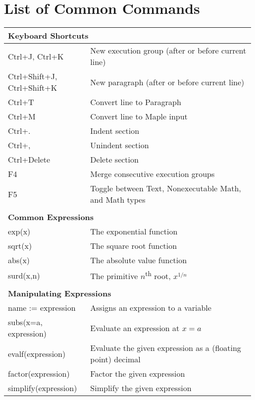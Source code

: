 \chapter{List of Common Commands}
\label{chp:list_of_common_commands}

\begin{fullwidth}
\begin{longtable}{p{0.33\linewidth} p{0.66\linewidth}}
    \multicolumn{2}{l}{\textbf{Keyboard Shortcuts}} \\
    \hline
    Ctrl+J, Ctrl+K & New execution group (after or before current line) \\
    Ctrl+Shift+J, Ctrl+Shift+K & New  paragraph (after or before current line) \\
    Ctrl+T & Convert line to Paragraph \\
    Ctrl+M & Convert line to Maple input \\
    Ctrl+. & Indent section \\
    Ctrl+, & Unindent section \\
    Ctrl+Delete & Delete section \\
    F4 & Merge consecutive execution groups \\
    F5 & Toggle between Text, Nonexecutable Math, and Math types \\
          &  \\
    \multicolumn{2}{l}{\textbf{Common Expressions}} \\
    \hline
    exp(x) & The exponential function \\
    sqrt(x) & The square root function \\
    abs(x) & The absolute value function \\
    surd(x,n) & The primitive $n$\textsuperscript{th} root, $x^{1/n}$ \\
          &  \\
    \multicolumn{2}{l}{\textbf{Manipulating Expressions}} \\
    \hline
    name := expression & Assigns an expression to a variable \\
    subs(x=a, expression) & Evaluate an expression at $x = a$ \\
    evalf(expression) & Evaluate the given expression as a (floating point) decimal \\
    factor(expression) & Factor the given expression \\
    simplify(expression) & Simplify the given expression \\

\end{longtable}
\end{fullwidth}
